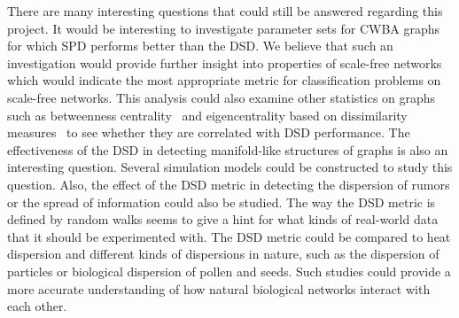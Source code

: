 There are many interesting questions that could still be answered regarding 
this project. It would be interesting to investigate parameter sets for CWBA
graphs for which SPD performs better than the DSD. We believe that such an 
investigation would provide further insight into properties of scale-free
networks which would indicate the most appropriate metric for classification
problems on scale-free networks. This analysis could also examine other 
statistics on graphs such as betweenness centrality~\cite{newman2005measure} and eigencentrality based on dissimilarity measures~\cite{alvarez2015eigencentrality}
to see whether they are correlated with DSD performance. The effectiveness of the DSD in detecting manifold-like structures of
graphs is also an interesting question. Several simulation models could be
constructed to study this question. Also, the effect of the DSD metric in
detecting the dispersion of rumors or the spread of information could also
be studied. The way the DSD metric is defined by random walks seems to give
a hint for what kinds of real-world data that it should be experimented with.
The DSD metric could be compared to heat dispersion and different kinds
of dispersions in nature, such as the dispersion of particles or biological
dispersion of pollen and seeds. Such studies could provide a more accurate
understanding of how natural biological networks interact with each other.
